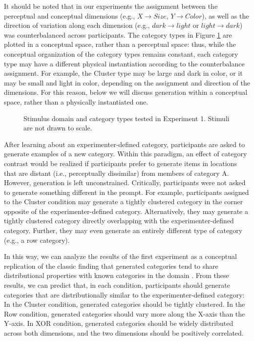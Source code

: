 \documentclass[12pt]{article}
\newcommand\inputpgf[2]{{
\let\pgfimageWithoutPath\pgfimage
\renewcommand{\pgfimage}[2][]{\pgfimageWithoutPath[##1]{#1/##2}}

}}
\begin{document}
\begin{flushleft}
It should be noted that in our experiments the assignment between the perceptual and conceptual dimensions (e.g., $X \rightarrow Size$, $Y \rightarrow Color$), as well as the direction of variation along each dimension (e.g., $dark \rightarrow light$ or $light \rightarrow dark$) was counterbalanced across participants. The category types in Figure \ref{fig:e1-conditions} are plotted in a conceptual space, rather than a perceptual space: thus, while the conceptual organization of the category types remains constant, each category type may have a different physical instantiation according to the counterbalance assignment. For example, the Cluster type  may be large and dark in color, or it may be small and light in color, depending on the assignment and direction of the dimensions. For this reason, below we will discuss generation within a conceptual space, rather than a physically instantiated one.

\begin{figure}
    \begin{center}
    \inputpgf{figs/}{e1-conditions.pgf}
    \caption{Stimulus domain and category types tested in Experiment 1. Stimuli are not drawn to scale.}
    \label{fig:e1-conditions}
    \end{center}
\end{figure}

After learning about an experimenter-defined category, participants are asked to generate examples of a new category. Within this paradigm, an effect of category contrast would be realized if participants prefer to generate items in locations that are distant (i.e., perceptually dissimilar) from members of category A. However, generation is left unconstrained. Critically, participants were not asked to generate something different in the prompt. For example, participants assigned to the Cluster condition may generate a tightly clustered category in the corner opposite of the experimenter-defined category. Alternatively, they may generate a tightly clustered category directly overlapping with the experimenter-defined category. Further, they may even generate an entirely different type of category (e.g., a row category). 

In this way, we can analyze the results of the first experiment as a conceptual replication of the classic finding that generated categories tend to share distributional properties with known categories in the domain \citep[see][]{jern2013probabilistic,ward1994structured}. From these results, we can predict that, in each condition, participants should generate categories that are distributionally similar to the experimenter-defined category: In the Cluster condition, generated categories should be tightly clustered. In the Row condition, generated categories should vary more along the X-axis than the Y-axis. In XOR condition, generated categories should be widely distributed across both dimensions, and the two dimensions should be positively correlated. 


\end{flushleft}
\end{document}
